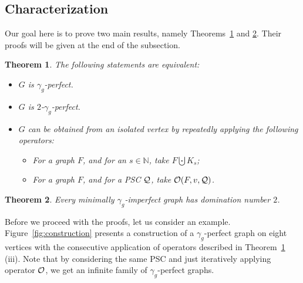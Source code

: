 \documentclass[12pt]{article}
\newtheorem{theorem}{Theorem}[section]
\newcommand{\cO}{{\cal O}}
\newcommand{\cQ}{{\cal Q}}
\begin{document}
\bigskip



\subsection{Characterization}
\label{subsec:char}

Our goal here is to prove two main results, namely Theorems~\ref{thm:char-1} and \ref{thm:minimp}. Their proofs will be given at the end of the subsection.

\begin{theorem} 
	\label{thm:char-1}
	The following statements are equivalent:
	\begin{itemize}
		\item[$(i)$] $G$ is $\gamma_g$-perfect.
		\item[$(ii)$] $G$ is $2$-$\gamma_g$-perfect.
		\item[$(iii)$] $G$ can be obtained from an isolated vertex by repeatedly applying the following operators:
		\begin{itemize}
			\item For a graph $F$, and for an $s\in \mathbb{N}$, take $F\bigcupdot  K_s$;
			\item For a graph $F$, and for a PSC $\cQ$, take $\cO(F,v,\cQ)$.
		\end{itemize} 
	\end{itemize}
	\end{theorem}

\begin{theorem}
	\label{thm:minimp}
Every minimally $\gamma_g$-imperfect graph has domination number $2$.  
\end{theorem}

Before we proceed with the proofs, let us consider an example. Figure~\ref{fig:construction} presents a construction of a $\gamma_g$-perfect graph on eight vertices with the consecutive application of operators described in Theorem~\ref{thm:char-1} (iii). Note that by considering the same PSC and just iteratively applying operator $\cO$, we get an infinite family of $\gamma_g$-perfect graphs.
\end{document}
